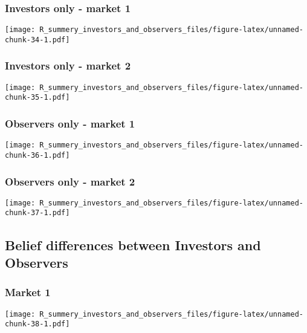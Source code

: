 \documentclass[]{article}
\begin{document}
\hypertarget{investors-only---market-1-2}{%
\subsubsection{Investors only - market
1}\label{investors-only---market-1-2}}

\texttt{[image: R\_summery\_investors\_and\_observers\_files/figure-latex/unnamed-chunk-34-1.pdf]}

\hypertarget{investors-only---market-2-2}{%
\subsubsection{Investors only - market
2}\label{investors-only---market-2-2}}

\texttt{[image: R\_summery\_investors\_and\_observers\_files/figure-latex/unnamed-chunk-35-1.pdf]}

\hypertarget{observers-only---market-1-2}{%
\subsubsection{Observers only - market
1}\label{observers-only---market-1-2}}

\texttt{[image: R\_summery\_investors\_and\_observers\_files/figure-latex/unnamed-chunk-36-1.pdf]}

\hypertarget{observers-only---market-2-2}{%
\subsubsection{Observers only - market
2}\label{observers-only---market-2-2}}

\texttt{[image: R\_summery\_investors\_and\_observers\_files/figure-latex/unnamed-chunk-37-1.pdf]}

\hypertarget{belief-differences-between-investors-and-observers-2}{%
\subsection{Belief differences between Investors and
Observers}\label{belief-differences-between-investors-and-observers-2}}

\hypertarget{market-1-2}{%
\subsubsection{Market 1}\label{market-1-2}}

\texttt{[image: R\_summery\_investors\_and\_observers\_files/figure-latex/unnamed-chunk-38-1.pdf]}
\end{document}
